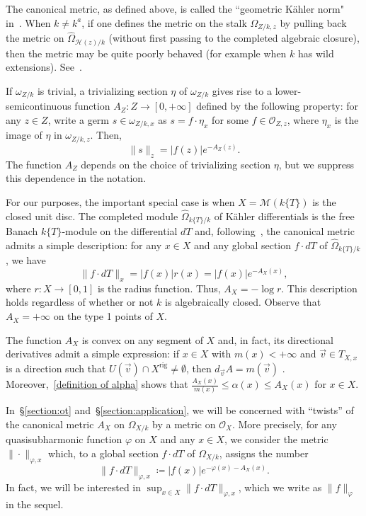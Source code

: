 \documentclass[10pt,reqno]{amsart}
\theoremstyle{plain}
\theoremstyle{definition}
\renewcommand{\H}{\mathcal{H}}
\numberwithin{equation}{section}
\renewcommand{\O}{\mathcal{O}}
\newcommand{\M}{\mathcal{M}}
\DeclareMathOperator{\rig}{rig}
\begin{document}
The canonical metric, as defined above, is called the ``geometric K\"ahler norm" in~\cite[6.3.15]{temkin}. When $k \not= k^a$, if one defines the metric on the stalk $\Omega_{Z/k,z}$ by pulling back the metric on $\widehat{\Omega}_{\H(z)/k}$ (without first passing to the completed algebraic closure), then the metric may be quite poorly behaved (for example when $k$ has wild extensions). See~\cite[6.2]{temkin}.

If $\omega_{Z/k}$ is trivial, a trivializing section $\eta$ of $\omega_{Z/k}$ gives rise to a lower-semicontinuous function $A_Z \colon Z \to [0,+\infty]$ defined by the following property: for any $z \in Z$, write a germ $s \in \omega_{Z/k,x}$ as $s = f \cdot \eta_x$ for some $f \in \O_{Z,z}$, where $\eta_x$ is the image of $\eta$ in $\omega_{Z/k,z}$. Then,
$$
\| s \|_z = |f(z)|e^{-A_Z(z)}.
$$
The function $A_Z$ depends on the choice of trivializing section $\eta$, but we suppress this dependence in the notation.

For our purposes, the important special case is when $X = \M(k\{ T \})$ is the closed unit disc. The completed module $\widehat{\Omega}_{k\{ T \}/k}$ of K\"ahler differentials is the free Banach $k\{ T \}$-module on the differential $dT$ and, following~\cite[6.2.1]{temkin}, the canonical metric admits a simple description: for any $x \in X$ and any global section $f \cdot dT$ of $\widehat{\Omega}_{k\{T\}/k}$, we have
$$
\| f \cdot dT \|_x = |f(x)| r(x) = |f(x)| e^{-A_X(x)},
$$
where $r \colon X \to [0,1]$ is the radius function. Thus, $A_X = -\log r$. This description holds regardless of whether or not $k$ is algebraically closed. Observe that $A_X = +\infty$ on the type 1 points of $X$.

The function $A_X$ is convex on any segment of $X$ and, in fact, its directional derivatives admit a simple expression: if $x \in X$ with $m(x) < +\infty$ and $\vec{v} \in T_{X,x}$ is a direction such that $U(\vec{v}) \cap X^{\rig} \not= \emptyset$, then $d_{\vec{v}} A = m(\vec{v})$ .
Moreover,~\cref{definition of alpha} shows that $\frac{A_X(x)}{m(x)} \leq \alpha(x) \leq A_X(x)$ for $x \in X$.

In~\S\ref{section:ot} and~\S\ref{section:application}, we will be concerned with ``twists'' of the canonical metric $A_X$ on $\Omega_{X/k}$ by a metric on $\O_X$. More precisely, for any quasisubharmonic function $\varphi$ on $X$ and any $x \in X$, we consider the metric $\| \cdot \|_{\varphi, x}$ which, to a global section $f \cdot dT$ of $\Omega_{X/k}$, assigns the number
$$
\| f \cdot dT \|_{\varphi,x} \coloneqq |f(x)|e^{-\varphi(x) - A_X(x)}.
$$
In fact, we will be interested in $\sup_{x \in X} \| f \cdot dT \|_{\varphi,x}$, which we write as $\| f \|_{\varphi}$ in the sequel.
\end{document}

